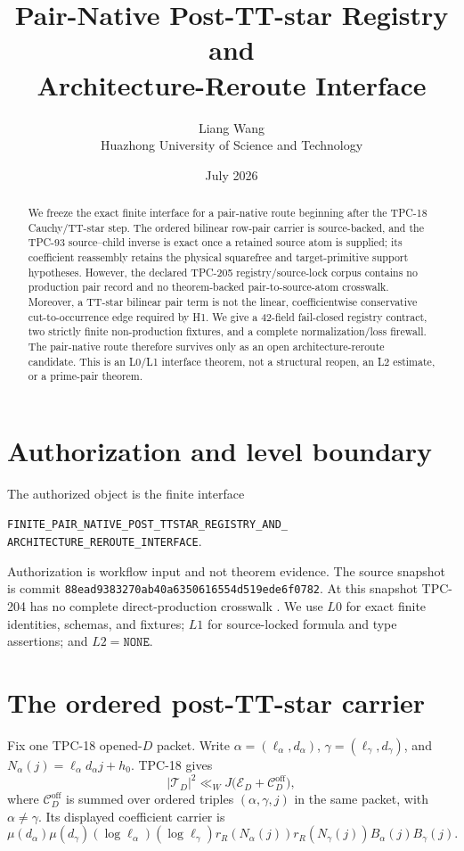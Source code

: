 \documentclass[11pt]{article}
\title{\textbf{Pair-Native Post-TT-star Registry and\\
Architecture-Reroute Interface}}
\author{Liang Wang\\Huazhong University of Science and Technology}
\date{July 2026}
\newcommand{\code}[1]{\nolinkurl{#1}}
\begin{document}
\maketitle

\begin{abstract}
We freeze the exact finite interface for a pair-native route beginning after
the TPC-18 Cauchy/TT-star step.  The ordered bilinear row-pair carrier is
source-backed, and the TPC-93 source--child inverse is exact once a retained
source atom is supplied; its coefficient reassembly retains the physical
squarefree and target-primitive support hypotheses.  However, the declared
TPC-205 registry/source-lock corpus contains no production pair record and no
theorem-backed pair-to-source-atom crosswalk.
Moreover, a TT-star bilinear pair term is not the linear, coefficientwise
conservative cut-to-occurrence edge required by H1.  We give a 42-field
fail-closed registry contract, two strictly finite non-production fixtures,
and a complete normalization/loss firewall.  The pair-native route therefore
survives only as an open architecture-reroute candidate.  This is an L0/L1
interface theorem, not a structural reopen, an L2 estimate, or a prime-pair
theorem.
\end{abstract}

\section{Authorization and level boundary}

The authorized object is the finite interface
\begin{center}
\small
\code{FINITE_PAIR_NATIVE_POST_TTSTAR_REGISTRY_AND_}\\
\code{ARCHITECTURE_REROUTE_INTERFACE}.
\end{center}
Authorization is workflow input and not theorem evidence.  The source
snapshot is commit
\code{88ead9383270ab40a6350616554d519ede6f0782}.  At this snapshot TPC-204
has no complete direct-production crosswalk \citep{WangTPC204}.  We use
\(L0\) for exact finite identities, schemas, and fixtures; \(L1\) for
source-locked formula and type assertions; and \(L2=\texttt{NONE}\).

\section{The ordered post-TT-star carrier}

Fix one TPC-18 opened-\(D\) packet.  Write
\(\alpha=(\ell_\alpha,d_\alpha)\),
\(\gamma=(\ell_\gamma,d_\gamma)\), and
\(N_\alpha(j)=\ell_\alpha d_\alpha j+h_0\).
TPC-18 gives \citep{WangTPC18}
\begin{equation}
 |\mathcal T_D|^2
 \ll_W J\bigl(\mathcal E_D+\mathcal C_D^{\mathrm{off}}\bigr),
 \label{eq:ttstar}
\end{equation}
where \(\mathcal C_D^{\mathrm{off}}\) is summed over ordered triples
\((\alpha,\gamma,j)\) in the same packet, with \(\alpha\ne\gamma\).
Its displayed coefficient carrier is
\begin{equation}
 \mu(d_\alpha)\mu(d_\gamma)
 (\log\ell_\alpha)(\log\ell_\gamma)
 r_R(N_\alpha(j))r_R(N_\gamma(j))
 B_\alpha(j)B_\gamma(j).
 \label{eq:carrier}
\end{equation}
\end{document}
